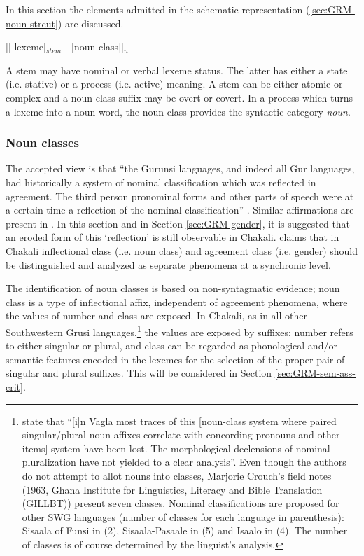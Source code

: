 \begin{exe}
\begin{exe}
\begin{exe}
{\begin{exe}
\begin{exe}
\begin{exe}
\begin{exe}
In this section the elements admitted in the
schematic representation (\ref{sec:GRM-noun-strcut}) are discussed.

\ea\label{sec:GRM-noun-strcut}
[[ {\sc lexeme}]$_{stem}$ - [{\sc noun class}]]$_{n}$
\z

A stem may have 
nominal or verbal lexeme status. The latter has either a state (i.e. stative) or
a process (i.e. active) meaning.  A stem can be either atomic or complex and a
noun class suffix may be overt or covert.  In a
 process which turns a lexeme into a noun-word,  the noun class provides the
syntactic category {\it noun}. 




\subsubsection{Noun classes}
\label{sec:GRM-noun-classes}

The accepted view is that ``the Gurunsi languages, and indeed all Gur languages,
had historically a system of nominal classification which was reflected in
agreement. The third person pronominal forms and other parts of speech were at a
certain time a reflection of the nominal classification''  \citep{Nade89}.
 Similar affirmations are present in \citet{Mane69b, Waa71, Nade82, Nade98,
Tcha07}.  In this section and in Section
\ref{sec:GRM-gender}, it is suggested that
an eroded form of this `reflection' is still observable in Chakali.
\citet{brin08c} claims that in Chakali inflectional class
(i.e. noun class) and agreement class (i.e. gender) should be distinguished and
analyzed as separate phenomena at a synchronic level.

 The identification of noun classes is based on non-syntagmatic evidence; noun
class is a type of inflectional  affix, independent of agreement
phenomena, where the values of number
and class are exposed. In Chakali, as in all  other Southwestern Grusi  
languages,\footnote{\citet[136]{Nade98} state that ``[i]n
Vagla most traces
of this [noun-class system where paired singular/plural noun affixes correlate
with concording pronouns and other items] system have been lost. The
morphological declensions of nominal pluralization have not yielded to a clear
analysis''.  Even though the authors do not attempt to allot nouns into classes,
Marjorie Crouch's field notes (1963, Ghana Institute for Linguistics, Literacy
and Bible Translation (GILLBT)) present seven classes. Nominal classifications
are proposed for other SWG languages (number of classes for each language in
parenthesis): Sisaala of Funsi in \citet{Rowl66} (2), Sisaala-Pasaale in
\citet{Mcgi99} (5) and Isaalo in \citet{Mora06} (4).  The number of classes is 
of
course determined by the linguist's analysis.\label{foot:noun-class}}  the
values are exposed by
suffixes: number refers to either singular or plural, and class can be regarded
as phonological and/or semantic features encoded in the lexemes for the
selection
of the proper pair of singular and plural suffixes. This will be considered in
Section \ref{sec:GRM-sem-ass-crit}. 




\end{exe}
\end{exe}
\end{exe}
\end{exe}}
\end{exe}
\end{exe}
\end{exe}
